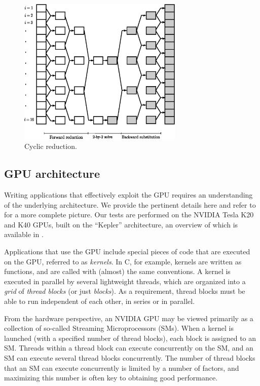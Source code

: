\documentclass{elsarticle}
\begin{document}
\begin{figure}
\begin{center}
\includegraphics[height=200pt]{img/cyclic-reduction.eps}
\end{center}
\caption{Cyclic reduction.}
\label{fig:cyclic-reduction}
\end{figure}

\subsection{GPU architecture} \label{subsec:gpu-architecture}

Writing applications that effectively exploit the GPU
requires an understanding of the underlying architecture.
We provide the pertinent details here
and refer to \cite{GPUcomputingera} for a more complete picture.
Our tests are performed on the NVIDIA Tesla K20 and K40 GPUs,
built on the ``Kepler'' architecture,
an overview of which is available in \cite{Keplerwhitepaper}.

Applications that use the GPU include special
pieces of code that are executed on the GPU,
referred to as \emph{kernels}.
In C, for example, kernels are written as functions,
and are called with (almost) the same conventions.
A kernel is executed in parallel by several lightweight threads,
which are organized into a \emph{grid} of \emph{thread blocks}
(or just \emph{blocks}).
As a requirement, thread blocks must be able to run
independent of each other,
in series or in parallel.

From the hardware perspective, an NVIDIA GPU may be viewed primarily as
a collection of so-called Streaming Microprocessors (SMs).
When a kernel is launched (with a specified number of thread blocks),
each block is assigned to an SM.
Threads within a thread block can execute concurrently on the SM,
and an SM can execute several thread blocks concurrently.
The number of thread blocks that an SM can execute concurrently
is limited by a number of factors,
and maximizing this number is often key to obtaining good performance.
\end{document}

